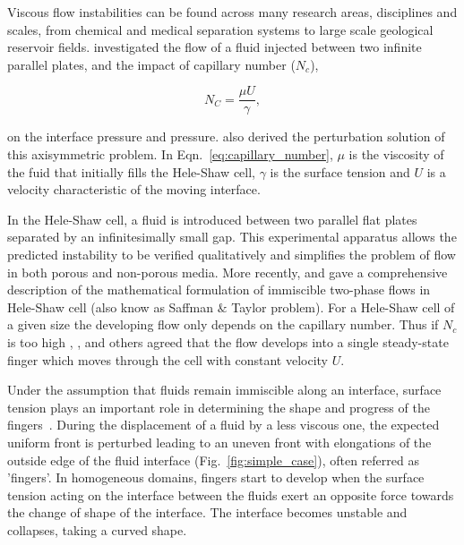 \documentclass[preprint,authoryear,12pt]{elsarticle}
\begin{document}
\medskip
Viscous flow instabilities can be found across many research areas, disciplines and scales, from chemical and medical separation systems to large scale geological reservoir fields. \citet{muskat_1934} investigated the flow of a fluid injected between two infinite parallel plates, and the impact of capillary number ($N_{c}$),

\begin{equation}
N_{C} = \frac{\mu U}{\gamma},
\label{eq:capillary_number}
\end{equation}

on the interface pressure and pressure. \citet{muskat_1934} also derived the perturbation solution of this axisymmetric problem. In Eqn.~\ref{eq:capillary_number}, $\mu$ is the viscosity of the fuid that initially fills the Hele-Shaw cell, $\gamma$ is the surface tension and $U$ is a velocity characteristic of the moving interface. 

\medskip
In the Hele-Shaw cell, a fluid is introduced between two parallel flat plates separated by an infinitesimally small gap. This experimental apparatus allows the predicted instability to be verified qualitatively and simplifies the problem of flow in both porous and non-porous media.   
More recently, \citet{howison_2000} and \citet{praud_2005} gave a comprehensive description of the mathematical formulation of immiscible two-phase flows in Hele-Shaw cell (also know as Saffman $\&$ Taylor problem). For a Hele-Shaw cell of a given size the developing flow only depends on the capillary number. Thus if \textit{$N_{c}$} is too high \citet{saffman_1959}, \citet{homsy_1987}, \citet{tabeling_1987} and others agreed that the flow develops into a single steady-state finger which moves through the cell with constant velocity $U$.

\medskip
 Under the assumption that fluids remain immiscible along an interface, surface tension plays an important role in determining the shape and progress of the fingers~\citep{howison_2000}. During the displacement of a fluid by a less viscous one, the expected uniform front is perturbed %
leading to an uneven front with elongations of the outside edge of the fluid interface (Fig.~\ref{fig:simple_case}), often referred as 'fingers'. In homogeneous domains, fingers start to develop when the surface tension acting on the interface between the fluids exert an opposite force towards the change of shape of the interface. The interface becomes unstable and collapses, taking a curved shape. 
\end{document}
